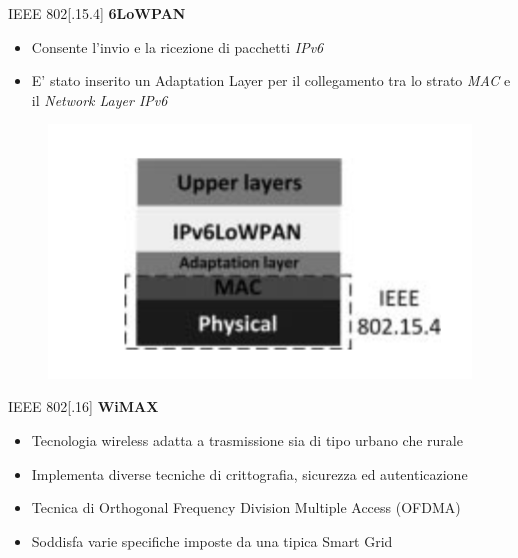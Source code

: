 \begin{frame}{IEEE 802[.15.4]}
	\textbf{6LoWPAN}
	\begin{itemize}
		\item Consente l'invio e la ricezione di pacchetti \textit{IPv6}
		\item E' stato inserito un Adaptation Layer per il collegamento tra lo strato \textit{MAC} e il \textit{Network Layer IPv6}
	\end{itemize}
	\begin{figure}[h]
		\includegraphics[scale=0.3,cfbox=blue_slides 1pt 0pt]{imgs/6pan.png}
	\end{figure}
\end{frame}

\begin{frame}{IEEE 802[.16]}
	\textbf{WiMAX}
	\begin{itemize}[<+- | alert@+>]
		\item Tecnologia wireless adatta a trasmissione sia di tipo urbano che rurale
		\item Implementa diverse tecniche di crittografia, sicurezza ed autenticazione
		\item Tecnica di Orthogonal Frequency Division Multiple Access (OFDMA)
		\item Soddisfa varie specifiche imposte da una tipica Smart Grid
	\end{itemize}
\end{frame}

